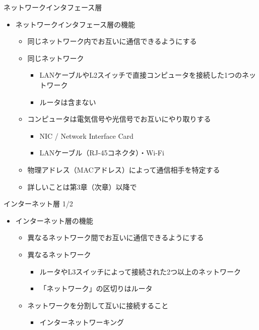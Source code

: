 \documentclass[12pt,aspectratio=169]{beamer}
\begin{document}
\begin{frame}{ネットワークインタフェース層}

  \begin{itemize}
    \item ネットワークインタフェース層の機能
      \begin{itemize}
        \item 同じネットワーク内でお互いに通信できるようにする
        \item 同じネットワーク
          \begin{itemize}
            \item LANケーブルやL2スイッチで直接コンピュータを接続した1つのネットワーク
            \item ルータは含まない
          \end{itemize}
        \item コンピュータは電気信号や光信号でお互いにやり取りする
          \begin{itemize}
            \item NIC / Network Interface Card
            \item LANケーブル（RJ-45コネクタ）・Wi-Fi
          \end{itemize}
        \item 物理アドレス（MACアドレス）によって通信相手を特定する
        \item 詳しいことは第3章（次章）以降で

      \end{itemize}

  \end{itemize}

\end{frame}


\begin{frame}{インターネット層 1/2}

  \begin{itemize}
    \item インターネット層の機能
      \begin{itemize}
        \item 異なるネットワーク間でお互いに通信できるようにする
        \item 異なるネットワーク
          \begin{itemize}
            \item ルータやL3スイッチによって接続された2つ以上のネットワーク
            \item 「ネットワーク」の区切りはルータ
          \end{itemize}

        \item ネットワークを分割して互いに接続すること
          \begin{itemize}
            \item インターネットワーキング
          \end{itemize}

      \end{itemize}

  \end{itemize}

\end{frame}
\end{document}
